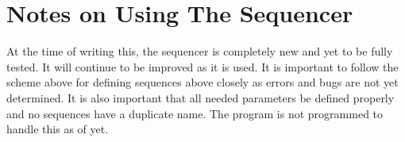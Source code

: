 \section{Notes on Using The Sequencer}

At the time of writing this, the sequencer is completely new and yet to be fully tested. It will continue to be improved as it is used. It is important to follow the scheme above for defining sequences above closely as errors and bugs are not yet determined. It is also important that all needed parameters be defined properly and no sequences have a duplicate name. The program is not programmed to handle this as of yet.
